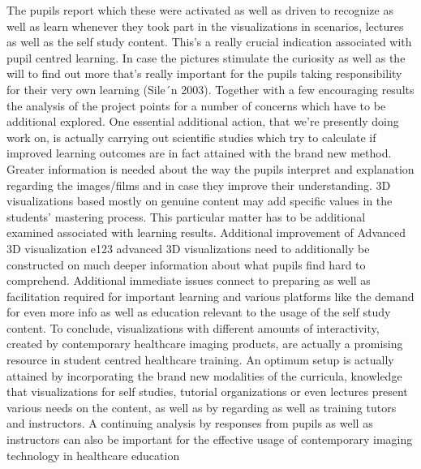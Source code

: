 \documentclass[]{article}
\begin{document}
The pupils report which these were activated as well as driven to
recognize as well as learn whenever they took part in the visualizations
in scenarios, lectures as well as the self study content. This's a
really crucial indication associated with pupil centred learning. In
case the pictures stimulate the curiosity as well as the will to find
out more that's really important for the pupils taking responsibility
for their very own learning (Sile´n 2003). Together with a few
encouraging results the analysis of the project points for a number of
concerns which have to be additional explored. One essential additional
action, that we're presently doing work on, is actually carrying out
scientific studies which try to calculate if improved learning outcomes
are in fact attained with the brand new method. Greater information is
needed about the way the pupils interpret and explanation regarding the
images/films and in case they improve their understanding. 3D
visualizations based mostly on genuine content may add specific values
in the students' mastering process. This particular matter has to be
additional examined associated with learning results. Additional
improvement of Advanced 3D visualization e123 advanced 3D visualizations
need to additionally be constructed on much deeper information about
what pupils find hard to comprehend. Additional immediate issues connect
to preparing as well as facilitation required for important learning and
various platforms like the demand for even more info as well as
education relevant to the usage of the self study content. To conclude,
visualizations with different amounts of interactivity, created by
contemporary healthcare imaging products, are actually a promising
resource in student centred healthcare training. An optimum setup is
actually attained by incorporating the brand new modalities of the
curricula, knowledge that visualizations for self studies, tutorial
organizations or even lectures present various needs on the content, as
well as by regarding as well as training tutors and instructors. A
continuing analysis by responses from pupils as well as instructors can
also be important for the effective usage of contemporary imaging
technology in healthcare education
\end{document}
